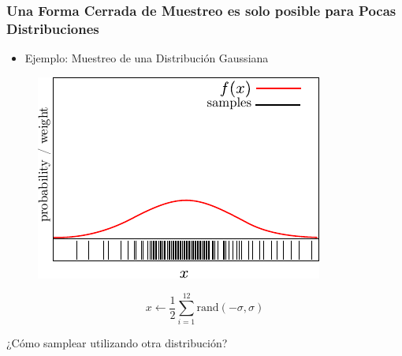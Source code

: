 \begin{frame}
    \frametitle{Una Forma Cerrada de Muestreo es solo posible para Pocas Distribuciones}

    \begin{itemize}
        \item Ejemplo: Muestreo de una Distribución Gaussiana
    \end{itemize}

    \begin{figure}
        \begin{minipage}[m]{.5\textwidth}
            \raggedright
            \begin{center}
                \includegraphics[width=\columnwidth]{./images/particle_filter/gaussian_approximation_by_sampling.pdf}
            \end{center}
        \end{minipage}%
        \begin{minipage}[m]{.5\textwidth}
            \raggedleft
            \centering
            \begin{equation*}
                x \leftarrow \frac{1}{2} \sum_{i=1}^{12} \text{rand}(-\sigma, \sigma)    
            \end{equation*}

        \end{minipage}
    \end{figure}

    ¿Cómo samplear utilizando otra distribución?



\end{frame}
    


